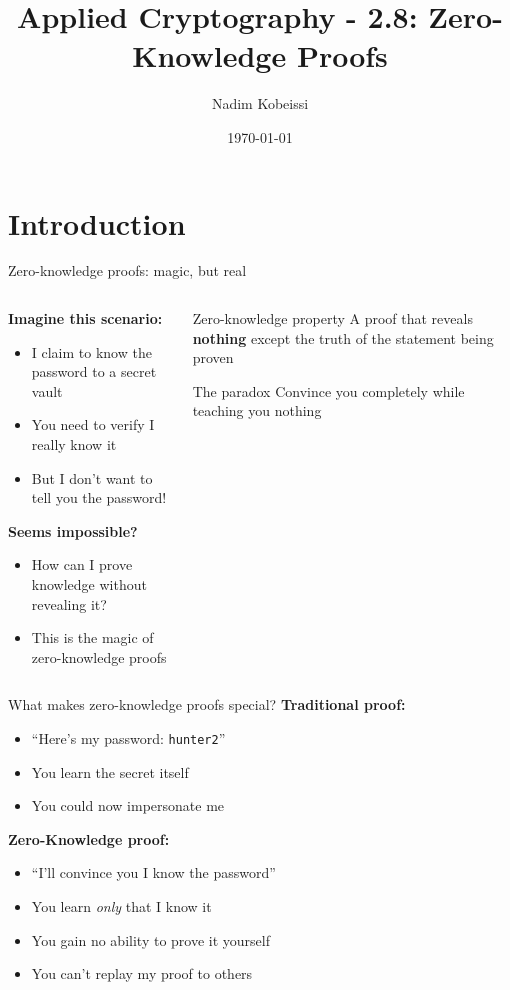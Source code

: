 \documentclass[aspectratio=169, lualatex, handout]{beamer}
\title{Applied Cryptography - 2.8: Zero-Knowledge Proofs}
\author{Nadim Kobeissi}
\institute{American University of Beirut}
\date{\today}
\begin{document}
\begin{frame}[plain]
	\titlepage
\end{frame}

\incompleteslideswarning

\section{Introduction}

\begin{frame}{Zero-knowledge proofs: magic, but real}
	\begin{columns}[c]
		\begin{column}{0.5\textwidth}
			\textbf{Imagine this scenario:}
			\begin{itemize}
				\item I claim to know the password to a secret vault
				\item You need to verify I really know it
				\item But I don't want to tell you the password!
			\end{itemize}
			\textbf{Seems impossible?}
			\begin{itemize}
				\item How can I prove knowledge without revealing it?
				\item This is the magic of zero-knowledge proofs
			\end{itemize}
		\end{column}
		\begin{column}{0.5\textwidth}
			\begin{block}{Zero-knowledge property}
				A proof that reveals \textbf{nothing} except the truth of the statement being proven
			\end{block}
			\vspace{0.5em}
			\begin{alertblock}{The paradox}
				Convince you completely while teaching you nothing
			\end{alertblock}
		\end{column}
	\end{columns}
\end{frame}

\begin{frame}{What makes zero-knowledge proofs special?}
	\textbf{Traditional proof:}
	\begin{itemize}
		\item ``Here's my password: \texttt{hunter2}''
		\item You learn the secret itself
		\item You could now impersonate me
	\end{itemize}
	\textbf{Zero-Knowledge proof:}
	\begin{itemize}
		\item ``I'll convince you I know the password''
		\item You learn \textit{only} that I know it
		\item You gain no ability to prove it yourself
		\item You can't replay my proof to others
	\end{itemize}
\end{frame}
\end{document}
